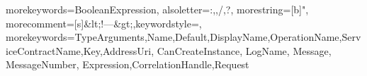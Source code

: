  {
    morekeywords={BooleanExpression},
    alsoletter={:,,/,?},
    morestring=[b]{"},
    morecomment=[s]{&lt;!--}{--&gt;},keywordstyle=\color{forestGreen},
    morekeywords={TypeArguments,Name,Default,DisplayName,OperationName,ServiceContractName,Key,AddressUri,
CanCreateInstance, LogName, Message, MessageNumber, Expression,CorrelationHandle,Request}
}

\newcommand{\XAML}[3]{
    \kodeprintstyle{#1}{#2}{#3}{xaml}{XAML}
}